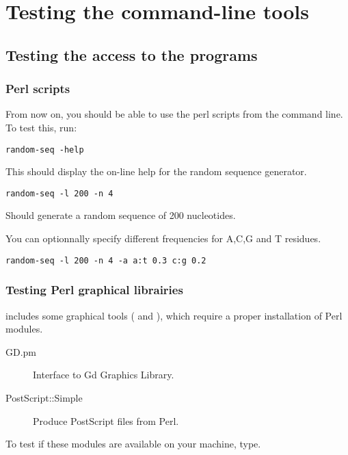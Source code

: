 \chapter{Testing the command-line tools}

\section{Testing the access to the programs}

\subsection{Perl scripts}

From now on, you should be able to use the perl scripts from the
command line. To test this, run:

\begin{lstlisting}
random-seq -help
\end{lstlisting}


This should display the on-line help for the random sequence
generator.

\begin{lstlisting}
random-seq -l 200 -n 4
\end{lstlisting}

Should generate a random sequence of 200 nucleotides.

You can optionnally specify different frequencies for A,C,G and T
residues.

\begin{lstlisting}
random-seq -l 200 -n 4 -a a:t 0.3 c:g 0.2
\end{lstlisting}



\subsection{Testing Perl graphical librairies}

\RSAT includes some graphical tools ( and
), which require a proper installation of Perl
modules.

\begin{description}
\item[GD.pm] Interface to Gd Graphics Library.
\item[PostScript::Simple]  Produce PostScript files from Perl.
\end{description}

To test if these modules are available on your machine, type.


